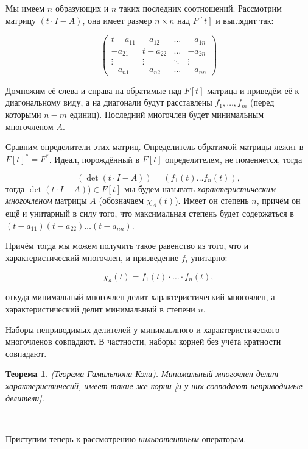 \documentclass[a4paper,100pt]{article}
\theoremstyle{indented}
\newtheorem{theorem}{Теорема}
\theoremstyle{definition}
\theoremstyle{remark}
\begin{document}
Мы имеем $n$ образующих и $n$ таких последних соотношений. Рассмотрим матрицу $(t\cdot I-A)$, она имеет размер $n\times n$ над $F[t]$ и выглядит так:

\begin{equation*}
    \begin{pmatrix}
        t-a_{11} & -a_{12} & \dots & -a_{1n}\\
        -a_{21} & t-a_{22} & \dots & -a_{2n}\\
        \vdots & \vdots &\ddots   & \vdots  \\
        -a_{n1} & -a_{n2} & \dots & -a_{nn}
    \end{pmatrix}
\end{equation*}

Домножим её слева и справа на обратимые над $F[t]$ матрица и приведём её к диагональному виду, а на диагонали будут расставлены $f_1, \ldots, f_m$ (перед которыми $n-m$ единиц). Последний многочлен будет минимальным многочленом $A$. \ 

Сравним определители этих матриц. Определитель обратимой матрицы лежит в $F[t]^*=F^*$. Идеал, порождённый в $F[t]$ определителем, не поменяется, тогда 

\[
    (\det (t\cdot I-A))=(f_1(t)\ldots f_n(t)), 
\]
тогда $\det (t\cdot I-A))\in F[t]$ мы будем называть \textit{характеристическим многочленом} матрицы $A$ (обозначаем $\chi_A(t)$). Имеет он степень $n$, причём он ещё и унитарный в силу того, что максимальная степень будет содержаться в $(t-a_{11})(t-a_{22})\ldots(t-a_{nn})$.\ 

Причём тогда мы можем получить такое равенство из того, что и характеристический многочлен, и призведение $f_i$ унитарно: 

\[
    \chi_a(t)=f_1(t)\cdot\ldots\cdot f_n(t),
\]

откуда минимальный многочлен делит характеристический многочлен, а характеристический делит минимальный в степени $n$. \ 

Наборы неприводимых делителей у минимаьлного и характеристического многочленов совпадают. В частности, наборы корней без учёта кратности совпадают.\\

\begin{theorem}
    (Теорема Гамильтона-Кэли). Минимальный многочлен делит характеристичесий, имеет такие же корни [и у них совпадают неприводимые делители].
\end{theorem}\

Приступим теперь к рассмотрению \textit{нильпотентным} операторам.
\end{document}

